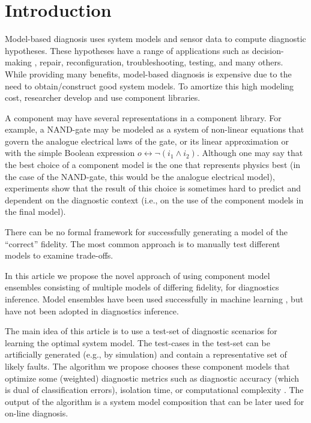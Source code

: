 \section{Introduction}
%
Model-based diagnosis \citep{dekleer87diagnosing} uses system models
and sensor data to compute diagnostic hypotheses. These hypotheses
have a range of applications such as decision-making
\cite{feldman13genius}, repair, reconfiguration, troubleshooting,
testing, and many others. While providing many benefits, model-based
diagnosis is expensive due to the need to obtain/construct good system
models. To amortize this high modeling cost, researcher develop and
use component libraries.
\par
A component may have several representations in a component
library. For example, a NAND-gate may be modeled as a system of
non-linear equations that govern the analogue electrical laws of the
gate, or its linear approximation or with the simple Boolean
expression $o \leftrightarrow \neg(i_1 \wedge i_2)$. Although one may
say that the best choice of a component model is the one that
represents physics best (in the case of the NAND-gate, this would be
the analogue electrical model), experiments show that the result of
this choice is sometimes hard to predict and dependent on the
diagnostic context (i.e., on the use of the component models in the
final model).
\par
There can be no formal framework for successfully generating a model
of the ``correct'' fidelity. The most common approach is to manually
test different models to examine trade-offs.
\par
In this article we propose the novel approach of using component model
ensembles consisting of multiple models of differing fidelity, for
diagnostics inference. Model ensembles have been used successfully in
machine learning \citep{brown2010ensemble,dietterich2000ensemble}, but
have not been adopted in diagnostics inference.
\par
The main idea of this article is to use a test-set of diagnostic
scenarios for learning the optimal system model. The test-cases in the
test-set can be artificially generated (e.g., by simulation) and
contain a representative set of likely faults. The algorithm we
propose chooses these component models that optimize some (weighted)
diagnostic metrics such as diagnostic accuracy (which is dual of
classification errors), isolation time, or computational complexity
\cite{feldman10empirical}. The output of the algorithm is a system
model composition that can be later used for on-line diagnosis.
